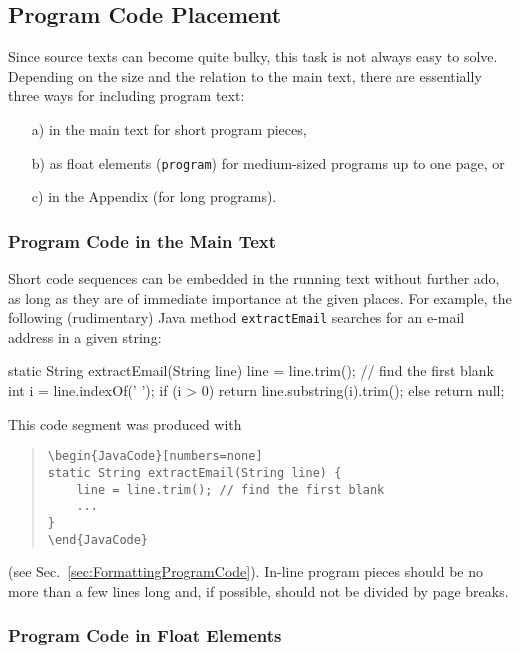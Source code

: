 \subsection{Program Code Placement}

Since source texts can become quite bulky, this task is not always easy to
solve. Depending on the size and the relation to the main text, there are
essentially three ways for including program text:
%
\begin{itemize}
    \item[a)] in the main text for short program pieces,
    \item[b)] as float elements (\texttt{program}) for medium-sized programs
    up to one page, or
    \item[c)] in the Appendix (for long programs).
\end{itemize}


\subsubsection{Program Code in the Main Text}

Short code sequences can be embedded in the running text without further ado,
as long as they are of immediate importance at the given places.
For example, the following (rudimentary) Java method \texttt{extractEmail}
searches for an e-mail address in a given string:
%
\begin{JavaCode}[numbers=none]
static String extractEmail(String line) {
    line = line.trim(); // find the first blank
    int i = line.indexOf(' ');
    if (i > 0)
    return line.substring(i).trim();
    else
    return null;
}
\end{JavaCode}
%
\noindent
This code segment was produced with
%
\begin{quote}
    \begin{verbatim}
\begin{JavaCode}[numbers=none]
static String extractEmail(String line) {
    line = line.trim(); // find the first blank
    ...
}
\end{JavaCode}
    \end{verbatim}
\end{quote}
%
(see Sec.\ \ref{sec:FormattingProgramCode}). In-line program pieces should be
no more than a few lines long and, if possible, should not be divided by page
breaks.


\subsubsection{Program Code in Float Elements}

